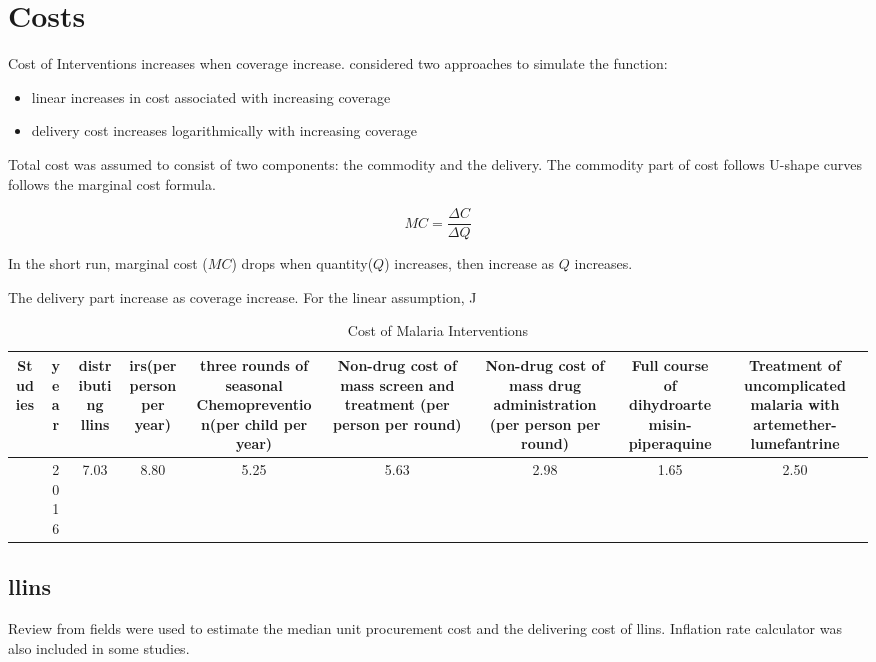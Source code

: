 \documentclass[a4paper, 12pt, twoside]{article}
\begin{document}
\section{Costs}
Cost of Interventions increases when coverage increase.\cite{Winskill2017a} considered two approaches to simulate the function:
\begin{itemize}
	\item linear increases in cost associated with increasing coverage
	\item delivery cost increases logarithmically with increasing coverage
\end{itemize}

Total cost was assumed to consist of two components: the commodity and the delivery. The commodity part of cost follows U-shape curves follows the marginal cost formula.

$$ MC = \frac{\Delta C}{\Delta Q} $$

In the short run, marginal cost ($MC$) drops when quantity($Q$) increases, then increase as $Q$ increases.

The delivery part increase as coverage increase. For the linear assumption, J

\begin{table}[htpb]
	\centering
	\caption{Cost of Malaria Interventions}
	\label{tab:cost_of_malaria_interventions}
	{\small
		\begin{tabular}{cSSSSSSSS}
			\toprule
			Studies           & {year} & {distributing \gls{llins}} & {\gls{irs}(per person per year)} & {three rounds of seasonal Chemoprevention(per child per year) } & {Non-drug cost of mass screen and treatment (per person per round)} & {Non-drug cost of mass drug administration (per person per round) } & {Full course of dihydroartemisin-piperaquine} & {Treatment of uncomplicated malaria with artemether-lumefantrine} \\
			\midrule
			\cite{Walker2016} & 2016   & 7.03                       & 8.80                             & 5.25                                                            & 5.63                                                                & 2.98                                                                & 1.65                                          & 2.50                                                              \\
			\bottomrule
		\end{tabular}
	}
\end{table}

\subsection{\gls{llins}}
Review from fields were used to estimate the median unit procurement cost and the delivering cost of \gls{llins}.
Inflation rate calculator was also included in some studies\cite{Walker2016}.
\end{document}
